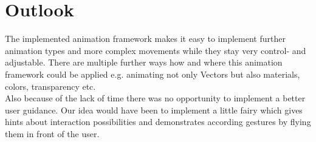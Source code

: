 \section{Outlook}

The implemented animation framework makes it easy to implement further animation types and more complex movements while they stay very control- and adjustable. There are multiple further ways how and where this animation framework could be applied e.g. animating not only Vectors but also materials, colors, transparency etc.\\

Also because of the lack of time there was no opportunity to implement a better user guidance. Our idea would have been to implement a little fairy which gives hints about interaction possibilities and demonstrates according gestures by flying them in front of the user.